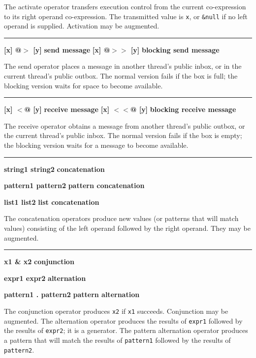 \noindent
The activate operator transfers execution
control from the current co-expression to its right operand
co-expression. The transmitted value is \texttt{x}, or \texttt{\&null}
if no left operand is supplied. Activation may be augmented.

\bigskip\hrule\vspace{0.1cm}
\noindent
{\bf [x] @$>$ [y] } \hfill {\bf send message}
 \linebreak
\noindent
{\bf [x] @$>>$ [y] } \hfill {\bf blocking send message}

\noindent
The send operator places a message in another thread's public
inbox, or in the current thread's public outbox. The normal version fails
if the box is full; the blocking version waits for space to become
available.

\bigskip\hrule\vspace{0.1cm}
\noindent
{\bf [x] $<$@ [y] } \hfill {\bf receive message}
 \linebreak
\noindent
{\bf [x] $<<$@ [y] } \hfill {\bf blocking receive message}

\noindent
The receive operator obtains a message from another thread's public
outbox, or the current thread's public inbox. The normal version fails
if the box is empty; the blocking version waits for a message to become
available.

\bigskip\hrule\vspace{0.1cm}
\noindent
{\bf string1 {\textbar}{\textbar} string2 } \hfill {\bf concatenation}

\noindent
{\bf pattern1 {\textbar}{\textbar} pattern2 } \hfill {\bf pattern concatenation}

\noindent
{\bf list1 {\textbar}{\textbar}{\textbar} list2 } \hfill {\bf list concatenation}

\noindent
The concatenation operators produce new values
(or patterns that will match values)
consisting of the left operand followed by the right
operand. They may be augmented.

\bigskip\hrule\vspace{0.1cm}
\noindent
{\bf x1 \& x2 } \hfill {\bf conjunction}

\noindent
{\bf expr1 {\textbar} expr2 } \hfill {\bf alternation}

\noindent
{\bf pattern1 .{\textbar} pattern2 } \hfill {\bf pattern alternation}

\noindent
The conjunction operator produces \texttt{x2} if
\texttt{x1} succeeds. Conjunction may be augmented.
The 
alternation operator produces the results of \texttt{expr1} followed
by the results of \texttt{expr2}; it is a generator.
The 
pattern alternation operator produces a pattern that will match
the results of \texttt{pattern1} followed
by the results of \texttt{pattern2}.


